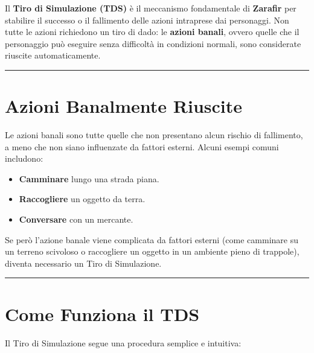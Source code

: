 \documentclass[../manuale_main.tex]{subfiles}
\begin{document}
Il \textbf{Tiro di Simulazione (TDS)} è il meccanismo fondamentale di \textbf{Zarafir} per stabilire il successo o il fallimento delle azioni intraprese dai personaggi. Non tutte le azioni richiedono un tiro di dado: le \textbf{azioni banali}, ovvero quelle che il personaggio può eseguire senza difficoltà in condizioni normali, sono considerate riuscite automaticamente.


\vspace{0.5cm}
\noindent
\begin{center}
\rule{\textwidth}{0.4pt} 
\end{center}
\vspace{0.5cm}

\section{Azioni Banalmente Riuscite}
Le azioni banali sono tutte quelle che non presentano alcun rischio di fallimento, a meno che non siano influenzate da fattori esterni. Alcuni esempi comuni includono:

\begin{itemize}
    \item \textbf{Camminare} lungo una strada piana.
    \item \textbf{Raccogliere} un oggetto da terra.
    \item \textbf{Conversare} con un mercante.
\end{itemize}

Se però l'azione banale viene complicata da fattori esterni (come camminare su un terreno scivoloso o raccogliere un oggetto in un ambiente pieno di trappole), diventa necessario un Tiro di Simulazione.


\vspace{0.5cm}
\noindent
\begin{center}
\rule{\textwidth}{0.4pt} 
\end{center}
\vspace{0.5cm}

\section{Come Funziona il TDS}
Il Tiro di Simulazione segue una procedura semplice e intuitiva:
\end{document}
